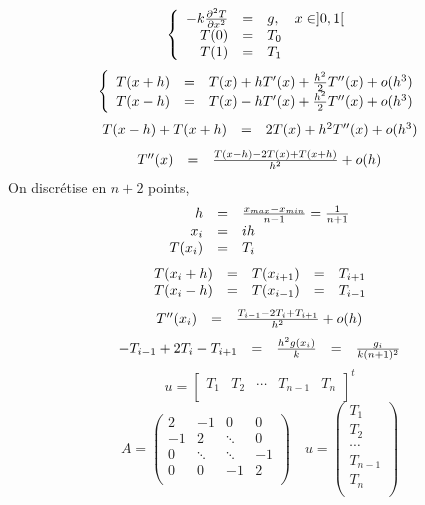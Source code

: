 \documentclass{article}
\begin{document}
\[
	\left \{
	\begin{array}{r c l}
		-k \frac{\partial^2 T}{\partial x^2} & = & g,\quad x \in ]0,1[ \\
		T(0) & = & T_0 \\
		T(1) & = & T_1 \\
	\end{array}
	\right .
\]
\[
	\left \{
	\begin{array}{r c l}
		T(x+h) & = & T(x) + hT'(x) + \frac{h^2}{2} T''(x) + o(h^3)\\
		T(x-h) & = & T(x) - hT'(x) + \frac{h^2}{2} T''(x) + o(h^3)\\
	\end{array}
	\right .
\]
\[
	\begin{array}{r c l}
		T(x-h)+T(x+h) & = & 2T(x) + h^2 T''(x) + o(h^3)\\
	\end{array}
\]
\[
	\begin{array}{r c l}
		T''(x) & = & \frac{T(x-h) - 2T(x) + T(x+h)}{h^2}  + o(h)\\
	\end{array}
\]
On discrétise  en $n+2$ points, 
\[
	\begin{array}{r c l}
	h & = & \frac{x_{max} - x_{min}}{n-1} = \frac{1}{n+1} \\
	x_i & = & ih \\
	T(x_i) & = & T_i \\
	\end{array}
\]
\[
	\begin{array}{r c c c l}
	T(x_i + h) & = & T(x_{i+1}) & = & T_{i+1} \\
	T(x_i - h) & = & T(x_{i-1}) & = & T_{i-1} \\
	\end{array}
\]
\[
	\begin{array}{r c l}
		T''(x_i) & = & \frac{T_{i-1} - 2T_i + T_{i+1}}{h^2}  + o(h)\\
	\end{array}
\]
\[
	\begin{array}{r c c c l}
		-T_{i-1} + 2T_i - T_{i+1} & = & \frac{h^2g(x_i)}{k} & = & \frac{g_i}{k(n+1)^2}\\
	\end{array}
\]
\[
	u = 
	\begin{bmatrix}
		T_1 & T_2 & \cdots & T_{n-1} & T_n \\
	\end{bmatrix}^t
\]
\[
	A = 
	\begin{pmatrix}
	2	& 	-1	&	0	& 0	\\
	-1	&	2	&\ddots	& 0	\\
	0	& \ddots&\ddots	&-1	\\
	0	& 	0	& -1 	& 2	\\
	\end{pmatrix}
	\quad u = 
	\begin{pmatrix}
		T_1 \\ T_2 \\ \cdots \\ T_{n-1} \\ T_n \\
	\end{pmatrix}
\]
\end{document}

